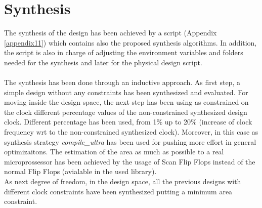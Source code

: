 \chapter{Synthesis}
\label{Synthesis}
The synthesis of the design has been achieved by a script (Appendix \ref{appendix11}) which contains also the proposed synthesis algorithms. In addition, the script is also in charge of adjusting the environment variables and folders needed for the synthesis and later for the physical design script.\\\\
The synthesis has been done through an inductive approach. As first step, a simple design without any constraints has been synthesized and evaluated. For moving inside the design space, the next step has been using as constrained on the clock different percentage values of the non-constrained synthesized design clock. Different percentage has been used, from 1\% up to 20\% (increase of clock frequency wrt to the non-constrained synthesized clock). Moreover, in this case as synthesis strategy \textit{compile\_ultra} has been used for pushing more effort in general optimizaitons. The estimation of the area as much as possible to a real microprossessor has been achieved by the usage of Scan Flip Flops instead of the normal Flip Flops (avialable in the used library).\\
As next degree of freedom, in the design space, all the previous designs with different clock constraints have been synthesized putting a minimum area constraint.

